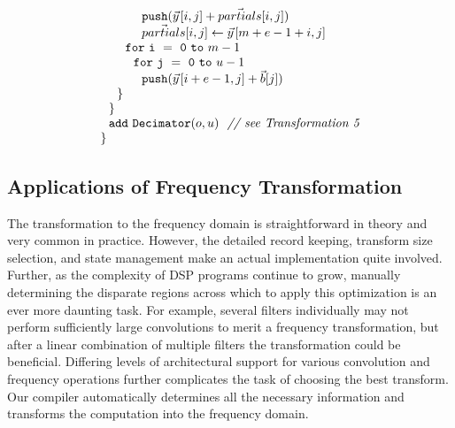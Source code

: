 \begin{equation}
{\begin{array}{ll}
    ~~~~~~~~~~{\tt push}(\vec{y}\hspace{1pt}[i,j] + \vec{partials}[i,j])\\
    ~~~~~~~~~~\vec{partials}[i,j] \leftarrow \vec{y}\hspace{1pt}[m+e-1+i,j]\\
    ~~~~~~{\tt for~i~=~0~to~}m-1\\
    ~~~~~~~~{\tt for~j~=~0~to~}u-1\\
    ~~~~~~~~~~{\tt push}(\vec{y}\hspace{1pt}[i+e-1,j] + {\vec b}[j])\\
    ~~~~{\tt \}} \\
    ~~{\tt \}} \\
    ~~{\tt add~Decimator}(o, u)~~\mbox{\it // see Transformation 5}\\
    {\tt \}} \\
  \end{array}}
\end{equation}

\subsection{Applications of Frequency Transformation}

The transformation to the frequency domain is straightforward in
theory and very common in practice. However, the detailed record
keeping, transform size selection, and state management make an actual
implementation quite involved.  Further, as the complexity of DSP
programs continue to grow, manually determining the disparate regions
across which to apply this optimization is an ever more daunting task.
For example, several filters individually may not perform sufficiently
large convolutions to merit a frequency transformation, but after a
linear combination of multiple filters the transformation could be
beneficial.  Differing levels of architectural support for various
convolution and frequency operations further complicates the task of
choosing the best transform.  Our compiler automatically determines
all the necessary information and transforms the computation into the
frequency domain.




